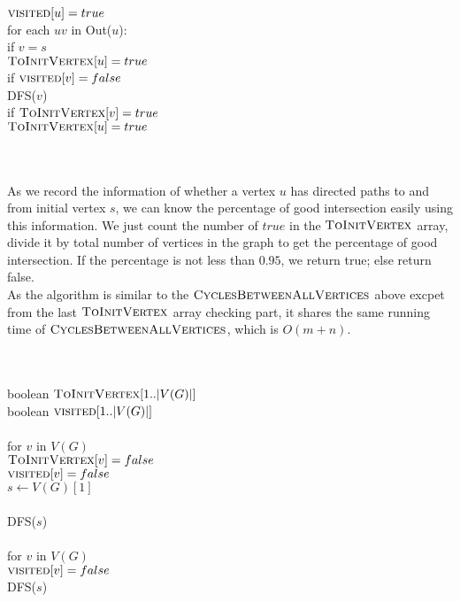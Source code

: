 \documentclass[11pt]{article}
\begin{document}
\begin{itemize}
\begin{algo}
\+
\\[0.5ex]
\\		$\textsc{visited}[u] = true$
\\		for each $uv$ in Out($u$):\+
\\			if $v = s$\+
\\				$\textsc{ToInitVertex}[u] = true$\-	
\\			if $\textsc{visited}[v] = false$\+
\\				DFS($v$)\-
\\			if $\textsc{ToInitVertex}[v] = true$\+
\\				$\textsc{ToInitVertex}[u] = true$\- \-
\\
\\
\\[0.5ex]
\end{algo}
As we record the information of whether a vertex $u$ has directed paths to and from initial vertex $s$, we can know the percentage of good intersection easily using this information. We just count the number of $true$ in the $\textsc{ToInitVertex}$ array, divide it by total number of vertices in the graph to get the percentage of good intersection. If the percentage is not less than $0.95$, we return true; else return false.\\
	As the algorithm is similar to the $\textsc{CyclesBetweenAllVertices}$ above excpet from the last $\textsc{ToInitVertex}$ array checking part, it shares the same running time of $\textsc{CyclesBetweenAllVertices}$, which is $O(m+n)$.
\begin{algo}
	\+
\\[0.5ex]
\\		boolean $\textsc{ToInitVertex}[1..|V(G)|]$
\\		boolean $\textsc{visited}[1..|V(G)|]$
\\
\\		for $v$ in $V(G)$\+
\\			$\textsc{ToInitVertex}[v] = false$
\\			$\textsc{visited}[v] = false$\-
\\		$s \gets V(G)[1]$
\\
\\		DFS($s$)
\\
\\		for $v$ in $V(G)$\+
\\			$\textsc{visited}[v] = false$\-
\\		DFS($s$)

\end{algo}
\end{itemize}
\end{document}
